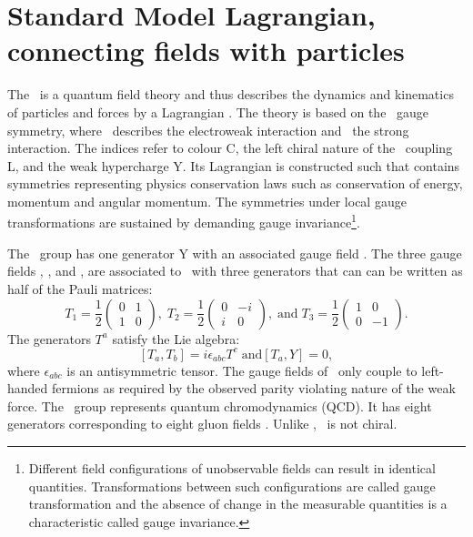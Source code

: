 \section{Standard Model Lagrangian, connecting fields with particles}
\label{sec:SMlagr}
The \SM\ is a quantum field theory and thus describes the dynamics and kinematics of particles and forces by a Lagrangian \Lagr. The theory is based on the \SSU\ gauge symmetry, where \SU\ describes the electroweak interaction and \Sthree\ the strong interaction. The indices refer to colour C, the left chiral nature of the \Stwo\ coupling L, and the weak hypercharge Y. Its Lagrangian is constructed such that contains symmetries representing physics conservation laws such as conservation of energy, momentum and angular momentum. The symmetries under local gauge transformations are sustained by demanding gauge invariance\footnote{Different field configurations of unobservable fields can result in identical quantities. Transformations between such configurations are called gauge transformation and the absence of change in the measurable quantities is a characteristic called gauge invariance.}.  



The \Uone\ group has one generator Y with an associated gauge field \Bfield. The three gauge fields \Wfieldone, \Wfieldtwo, and \Wfieldthree, are associated to \Stwo\ with three generators that can can  be written as half of the Pauli matrices: 
\begin{equation}
T_1 =  \frac{1}{2}
\begin{pmatrix}
0  &  1      \\
1  & 0      
\end{pmatrix}, \;
T_2= \frac{1}{2}
\begin{pmatrix}
0  &  -i     \\
i  &  0      
\end{pmatrix},\;\mathrm{ and } \;
 T_3= \frac{1}{2}
 \begin{pmatrix}
 1  &  0     \\
 0  &  -1 
 \end{pmatrix}.
\end{equation}
The generators $T^a$ satisfy the Lie algebra: 
\begin{equation}
 \left[T_a,T_b\right] = i \epsilon_{abc} T^c \; \mathrm{ and } \left[T_a, Y\right] = 0, 
\end{equation}
where $\epsilon_{abc}$ is an antisymmetric tensor. The gauge fields of \Stwo\ only couple to left-handed fermions as required by the observed parity violating nature of the weak force. The \Sthree\ group represents quantum chromodynamics (QCD). It  has eight generators corresponding to eight gluon fields \Gfields. Unlike \SU, \Sthree\ is not chiral. 

